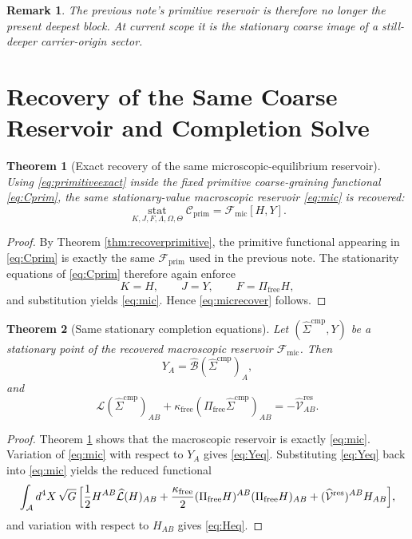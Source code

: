\documentclass[11pt]{article}
\newcommand{\Sub}{\mathcal A}
\newcommand{\CompLift}{\widehat\Sigma^{\mathrm{cmp}}}
\newcommand{\ResidualLift}{\widehat{\mathcal V}^{\mathrm{res}}}
\newcommand{\SubGaugeVec}{\widehat{\mathcal B}}
\newcommand{\SubReducedEin}{\widehat{\mathcal L}}
\newcommand{\FreeProj}{\Pi_{\mathrm{free}}}
\newcommand{\GaugeAux}{Y}
\newcommand{\MicFunctional}{\mathscr F_{\mathrm{mic}}}
\newcommand{\PrimFunctional}{\mathscr F_{\mathrm{prim}}}
\newcommand{\FreeStiff}{\kappa_{\mathrm{free}}}
\newcommand{\PrimStrain}{K}
\newcommand{\PrimNeutral}{J}
\newcommand{\PrimFree}{F}
\newcommand{\StrainMult}{\Lambda}
\newcommand{\NeutralMult}{\Omega}
\newcommand{\FreeMult}{\Theta}
\newtheorem{remark}{Remark}
\newtheorem{theorem}{Theorem}
\begin{document}
\begin{remark}
The previous note's primitive reservoir is therefore no longer the present deepest block. At current scope it is the stationary coarse image of a still-deeper carrier-origin sector.
\end{remark}

\section{Recovery of the Same Coarse Reservoir and Completion Solve}

\begin{theorem}[Exact recovery of the same microscopic-equilibrium reservoir]
\label{thm:recovermic}
Using \eqref{eq:primitiveexact} inside the fixed primitive coarse-graining functional \eqref{eq:Cprim}, the same stationary-value macroscopic reservoir \eqref{eq:mic} is recovered:
\begin{equation}
\operatorname*{stat}_{\PrimStrain,\PrimNeutral,\PrimFree,\StrainMult,\NeutralMult,\FreeMult}
\mathscr C_{\mathrm{prim}}
=
\MicFunctional[H,\GaugeAux].
\label{eq:micrecover}
\end{equation}
\end{theorem}

\begin{proof}
By Theorem \ref{thm:recoverprimitive}, the primitive functional appearing in \eqref{eq:Cprim} is exactly the same \(\PrimFunctional\) used in the previous note. The stationarity equations of \eqref{eq:Cprim} therefore again enforce
\[
\PrimStrain=H,
\qquad
\PrimNeutral=\GaugeAux,
\qquad
\PrimFree=\FreeProj H,
\]
and substitution yields \eqref{eq:mic}. Hence \eqref{eq:micrecover} follows.
\end{proof}

\begin{theorem}[Same stationary completion equations]
\label{thm:stationary}
Let \((\CompLift,\GaugeAux)\) be a stationary point of the recovered macroscopic reservoir \(\MicFunctional\). Then
\begin{equation}
\GaugeAux_A=\SubGaugeVec(\CompLift)_A,
\label{eq:Yeq}
\end{equation}
and
\begin{equation}
\SubReducedEin(\CompLift)_{AB}
+\FreeStiff(\FreeProj\CompLift)_{AB}
=
-\ResidualLift_{AB}.
\label{eq:Heq}
\end{equation}
\end{theorem}

\begin{proof}
Theorem \ref{thm:recovermic} shows that the macroscopic reservoir is exactly \eqref{eq:mic}. Variation of \eqref{eq:mic} with respect to \(\GaugeAux_A\) gives \eqref{eq:Yeq}. Substituting \eqref{eq:Yeq} back into \eqref{eq:mic} yields the reduced functional
\[
\int_{\Sub} d^4X\,\sqrt{G}\,
\Bigl[
\frac12 H^{AB}\SubReducedEin(H)_{AB}
+\frac{\FreeStiff}{2}(\FreeProj H)^{AB}(\FreeProj H)_{AB}
+(\ResidualLift)^{AB}H_{AB}
\Bigr],
\]
and variation with respect to \(H_{AB}\) gives \eqref{eq:Heq}.
\end{proof}
\end{document}
